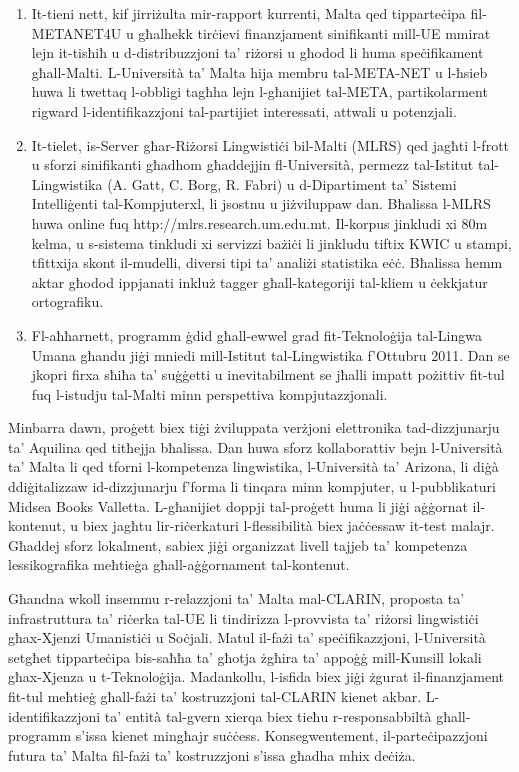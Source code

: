\documentclass[]{../../metanetpaper}
\begin{document}
\begin{multicols}{2}
\begin{enumerate}
\item It-tieni nett, kif jirriżulta mir-rapport kurrenti, Malta qed tipparteċipa fil-METANET4U u għalhekk tirċievi finanzjament sinifikanti mill-UE mmirat lejn it-tisħiħ u d-distribuzzjoni ta’ riżorsi u għodod li huma speċifikament għall-Malti. L-Università ta’ Malta hija membru tal-META-NET u l-ħsieb huwa li twettaq l-obbligi tagħha lejn l-għanijiet tal-META, partikolarment rigward l-identifikazzjoni tal-partijiet interessati, attwali u potenzjali. 

\item It-tielet, is-Server għar-Riżorsi Lingwistiċi bil-Malti (MLRS) qed jagħti l-frott u sforzi sinifikanti għadhom għaddejjin fl-Università, permezz tal-Istitut tal-Lingwistika (A. Gatt, C. Borg, R. Fabri) u d-Dipartiment ta’ Sistemi Intelliġenti tal-Kompjuterxl, li jsostnu u jiżviluppaw dan. Bħalissa l-MLRS huwa online fuq http://mlrs.research.um.edu.mt. Il-korpus jinkludi xi 80m kelma, u s-sistema tinkludi xi servizzi bażiċi li jinkludu tiftix KWIC u stampi, tfittxija skont il-mudelli, diversi tipi ta’ analiżi statistika eċċ. Bħalissa hemm aktar għodod ippjanati inkluż tagger għall-kategoriji tal-kliem u ċekkjatur ortografiku.

\item Fl-aħħarnett, programm ġdid għall-ewwel grad fit-Teknoloġija tal-Lingwa Umana għandu jiġi mniedi mill-Istitut tal-Lingwistika f’Ottubru 2011. Dan se jkopri firxa sħiħa ta’ suġġetti u inevitabilment se jħalli impatt pożittiv fit-tul fuq l-istudju tal-Malti minn perspettiva kompjutazzjonali.
\end{enumerate}

Minbarra dawn, proġett biex tiġi żviluppata verżjoni elettronika tad-dizzjunarju ta’ Aquilina \cite{Aquilina:1987,Aquilina:1990} qed titħejja bħalissa. Dan huwa sforz kollaborattiv bejn l-Università ta’ Malta li qed tforni l-kompetenza lingwistika, l-Università ta’ Arizona, li diġà ddiġitalizzaw id-dizzjunarju f’forma li tinqara minn kompjuter, u l-pubblikaturi Midsea Books Valletta. L-għanijiet doppji tal-proġett huma li jiġi aġġornat il-kontenut, u biex jagħtu lir-riċerkaturi l-flessibilità biex jaċċessaw it-test malajr. Għaddej sforz lokalment, sabiex jiġi organizzat livell tajjeb ta’ kompetenza lessikografika meħtieġa għall-aġġornament tal-kontenut.

Għandna wkoll insemmu r-relazzjoni ta’ Malta mal-CLARIN,  proposta ta’ infrastruttura ta’ riċerka tal-UE li tindirizza l-provvista ta’ riżorsi lingwistiċi għax-Xjenzi Umanistiċi u Soċjali. Matul il-fażi ta’ speċifikazzjoni, l-Università setgħet tipparteċipa bis-saħħa ta’ għotja żgħira ta’ appoġġ mill-Kunsill lokali għax-Xjenza u t-Teknoloġija. Madankollu, l-isfida biex jiġi żgurat il-finanzjament fit-tul meħtieġ għall-fażi ta’ kostruzzjoni tal-CLARIN kienet akbar. L-identifikazzjoni ta’ entità tal-gvern xierqa biex tieħu r-responsabbiltà għall-programm s’issa kienet mingħajr suċċess. Konsegwentement, il-parteċipazzjoni futura ta’ Malta fil-fażi ta’ kostruzzjoni s’issa għadha mhix deċiża.


\end{multicols}
\end{document}
